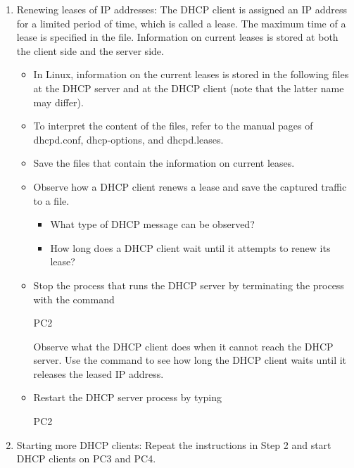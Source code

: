 \begin{enumerate}
	\item Renewing leases of IP addresses: The DHCP client is assigned an IP address for a limited period of time, which is called a lease. The maximum time of a lease is specified in the  file. Information on current leases is stored at both the client side and the server side.
		\begin{itemize}
			\item In Linux, information on the current leases is stored in the following files  at the DHCP server and  at the DHCP client (note that the latter name may differ).
			\item To interpret the content of the files, refer to the manual pages of dhcpd.conf, dhcp-options, and dhcpd.leases.
			\item Save the files that contain the information on current leases.
			\item Observe how a DHCP client renews a lease and save the captured traffic to a file.
				\begin{itemize}
					\item What type of DHCP message can be observed?
					\item How long does a DHCP client wait until it attempts to renew its lease?
				\end{itemize}
			\item Stop the process that runs the DHCP server by terminating the process  with the command
				\begin{cmdblock}
	PC2%
				\end{cmdblock}
				Observe what the DHCP client does when it cannot reach the DHCP server. Use the command  to see how long the DHCP client waits until it releases the leased IP address.
			\item Restart the DHCP server process by typing
				\begin{cmdblock}
	PC2%
				\end{cmdblock}
		\end{itemize}
	\item Starting more DHCP clients: Repeat the instructions in Step 2 and start DHCP clients on PC3 and PC4.
\end{enumerate}

